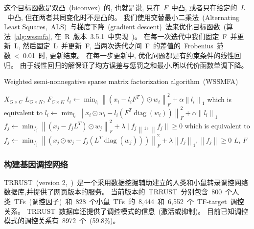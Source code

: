 这个目标函数是双凸~(biconvex)~的, 也就是说, 只在~$F$~中凸, 或者只在给定的~$L$~中凸, 但在两者共同变化时不是凸的。
我们使用交替最小二乘法~(Alternating Least Squares,~ALS)~与梯度下降~(gradient descent)~法来优化目标函数~(算法~\ref{alg:wssmfa}, 
在~R~版本~3.5.1~中实现~\cite{goeman2012penalized,goeman2010l1})。
在每一次迭代中我们固定~F~并更新~L, 然后固定~L~并更新~F, 当两次迭代之间~F~的差值的~Frobenius~范数~<~0.01~时, 更新结束。
在每一步更新中, 优化问题都是有约束条件的线性回归。
由于线性回归的解保证了均方误差与惩罚之和最小,所以代价函数单调下降。
\begin{algorithm}
    \caption{Weighted semi-nonnegative sparse matrix factorization algorithm~(WSSMFA)}
    \label{alg:wssmfa}
    \begin{algorithmic}[1]
    \Require  $X_{G \times C}$                                   
    \Ensure $L_{G \times K}$, $F_{C \times K}$                
                \State $l_{i} \leftarrow \min _{l_{i}}\left\|\left(x_{i}-l_{i} F^{T}\right) \odot w_{i}\right\|_{F}^{2}+\alpha\left\|l_{i}\right\|_{1}$
                \State which is equivalent to 
                \State $l_{i} \leftarrow \min _{l_{i}}\left\|x_{i} \odot w_{i}-l_{i}\left(F^{T} \operatorname{diag}\left(w_{i}\right)\right)\right\|_{F}^{2}+\alpha\left\|l_{i}\right\|_{1}$
            \EndFor
                \State $f_{j} \leftarrow \min _{f_{j}}\left\|\left(x_{j}-f_{j} L^{T}\right) \odot w_{j}\right\|_{F}^{2}+\lambda \mid f_{j}\left\|_{1},\right\| f_{j} \| \geq 0$
                \State which is equivalent to 
                \State $f_{j} \leftarrow \min _{f_{j}}\left\|\left(x_{j} \odot w_{j}-f_{j}\left(L^{T} \operatorname{diag}\left(w_{j}\right)\right)\right)\right\|_{F}^{2}+\lambda\left\|f_{j}\right\|_{1},\left\|f_{j}\right\| \geq 0$
            \EndFor
        \EndWhile  
        \State \Return $L$, $F$        
  \end{algorithmic}
\end{algorithm}

\subsubsection{构建基因调控网络}
TRRUST~(version 2,~\cite{han2018trrust})~是一个采用数据挖掘辅助建立的人类和小鼠转录调控网络数据库,并提供了网页版本的服务。
当前版本的~TRRUST~分别包含~800~个人类~TFs~(调控因子)~和~828~个小鼠~TFs~的~8,444~和~6,552~个~TF-target~调控关系。
TRRUST~数据库还提供了调控模式的信息~(激活或抑制)。
目前已知调控模式的调控关系有~8972~个~(59.8\%)。

